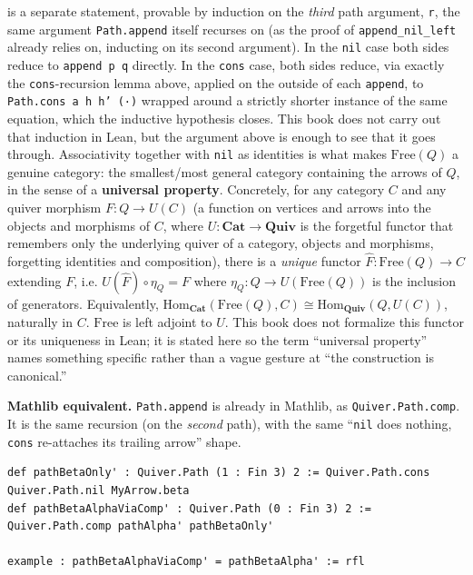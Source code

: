 is a separate statement, provable by induction on the \emph{third} path argument, \texttt{r}, the same argument \texttt{Path.append} itself recurses on (as the proof of \texttt{append\_\allowbreak{}nil\_\allowbreak{}left} already relies on, inducting on its second argument). In the \texttt{nil} case both sides reduce to \texttt{append p q} directly. In the \texttt{cons} case, both sides reduce, via exactly the \texttt{cons}-recursion lemma above, applied on the outside of each \texttt{append}, to \texttt{Path.cons a h h' (·)} wrapped around a strictly shorter instance of the same equation, which the inductive hypothesis closes. This book does not carry out that induction in Lean, but the argument above is enough to see that it goes through. Associativity together with \texttt{nil} as identities is what makes \(\mathrm{Free}(Q)\) a genuine category: the smallest/most general category containing the arrows of \(Q\), in the sense of a \textbf{universal property}. Concretely, for any category \(C\) and any quiver morphism \(F : Q \to U(C)\) (a function on vertices and arrows into the objects and morphisms of \(C\), where \(U : \mathbf{Cat} \to \mathbf{Quiv}\) is the forgetful functor that remembers only the underlying quiver of a category, objects and morphisms, forgetting identities and composition), there is a \emph{unique} functor \(\hat F : \mathrm{Free}(Q) \to C\) extending \(F\), i.e. \(U(\hat F) \circ \eta_Q = F\) where \(\eta_Q : Q \to U(\mathrm{Free}(Q))\) is the inclusion of generators. Equivalently, \(\mathrm{Hom}_{\mathbf{Cat}}(\mathrm{Free}(Q), C) \cong \mathrm{Hom}_{\mathbf{Quiv}}(Q, U(C))\), naturally in \(C\). \(\mathrm{Free}\) is left adjoint to \(U\). This book does not formalize this functor or its uniqueness in Lean; it is stated here so the term ``universal property'' names something specific rather than a vague gesture at ``the construction is canonical.''

\textbf{Mathlib equivalent.} \texttt{Path.append} is already in Mathlib, as \texttt{Quiver.Path.comp}. It is the same recursion (on the \emph{second} path), with the same ``\texttt{nil} does nothing, \texttt{cons} re-attaches its trailing arrow'' shape.

\begin{lstlisting}
def pathBetaOnly' : Quiver.Path (1 : Fin 3) 2 := Quiver.Path.cons Quiver.Path.nil MyArrow.beta
def pathBetaAlphaViaComp' : Quiver.Path (0 : Fin 3) 2 := Quiver.Path.comp pathAlpha' pathBetaOnly'

example : pathBetaAlphaViaComp' = pathBetaAlpha' := rfl
\end{lstlisting}

